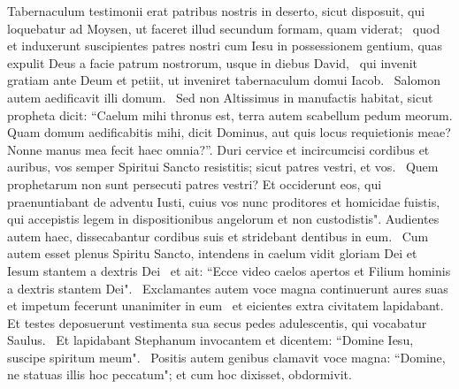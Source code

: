 \begin{biblechapter}
\verse Tabernaculum testimonii erat patribus nostris in deserto, sicut disposuit, qui loquebatur ad Moysen, ut faceret illud secundum formam, quam viderat;  
\verse quod et induxerunt suscipientes patres nostri cum Iesu in possessionem gentium, quas expulit Deus a facie patrum nostrorum, usque in diebus David,  
\verse qui invenit gratiam ante Deum et petiit, ut inveniret tabernaculum domui Iacob.  
\verse Salomon autem aedificavit illi domum.  
\verse Sed non Altissimus in manufactis habitat, sicut propheta dicit: 
\verse “Caelum mihi thronus est, terra autem scabellum pedum meorum. Quam domum aedificabitis mihi, dicit Dominus, aut quis locus requietionis meae? 
\verse Nonne manus mea fecit haec omnia?”. 
\verse Duri cervice et incircumcisi cordibus et auribus, vos semper Spiritui Sancto resistitis; sicut patres vestri, et vos.  
\verse Quem prophetarum non sunt persecuti patres vestri? Et occiderunt eos, qui praenuntiabant de adventu Iusti, cuius vos nunc proditores et homicidae fuistis,  
\verse qui accepistis legem in dispositionibus angelorum et non custodistis". 
\verse Audientes autem haec, dissecabantur cordibus suis et stridebant dentibus in eum.  
\verse Cum autem esset plenus Spiritu Sancto, intendens in caelum vidit gloriam Dei et Iesum stantem a dextris Dei  
\verse et ait: “Ecce video caelos apertos et Filium hominis a dextris stantem Dei".  
\verse Exclamantes autem voce magna continuerunt aures suas et impetum fecerunt unanimiter in eum  
\verse et eicientes extra civitatem lapidabant. Et testes deposuerunt vestimenta sua secus pedes adulescentis, qui vocabatur Saulus.  
\verse Et lapidabant Stephanum invocantem et dicentem: “Domine Iesu, suscipe spiritum meum".  
\verse Positis autem genibus clamavit voce magna: “Domine, ne statuas illis hoc peccatum"; et cum hoc dixisset, obdormivit. 
\end{biblechapter}


